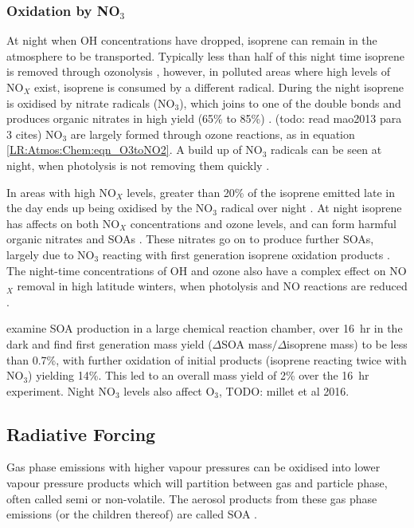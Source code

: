     \subsubsection{Oxidation by NO$_3$}
    At night when OH concentrations have dropped, isoprene can remain in the atmosphere to be transported.
    Typically less than half of this night time isoprene is removed through ozonolysis \citep{AtkinsonArey2003}, however, in polluted areas where high levels of NO$_X$ exist, isoprene is consumed by a different radical.
    During the night isoprene is oxidised by nitrate radicals (NO$_3$), which joins to one of the double bonds and produces organic nitrates in high yield (65\% to 85\%) \citep{Mao2013}. (todo: read mao2013 para 3 cites)
    NO$_3$ are largely formed through ozone reactions, as in equation \ref{LR:Atmos:Chem:eqn_O3toNO2}.
    A build up of NO$_3$ radicals can be seen at night, when photolysis is not removing them quickly \citep{Atkinson2000,Brown2009}.
    
    In areas with high NO$_X$ levels, greater than 20\% of the isoprene emitted late in the day ends up being oxidised by the NO$_3$ radical over night \citep{Brown2009}.
    At night isoprene has affects on both NO$_X$ concentrations and ozone levels, and can form harmful organic nitrates and SOAs \citep{Brown2009, Mao2013}.
    These nitrates go on to produce further SOAs, largely due to NO$_3$ reacting with first generation isoprene oxidation products \citep{Rollins2009}.
    The night-time concentrations of OH and ozone also have a complex effect on NO$_X$ removal in high latitude winters, when photolysis and NO reactions are reduced \citep{Ayers2006}.
    
    
    \cite{Rollins2009} examine SOA production in a large chemical reaction chamber, over 16~hr in the dark and find first generation mass yield ($\Delta$SOA mass$/\Delta$isoprene mass) to be less than 0.7\%, with further oxidation of initial products (isoprene reacting twice with NO$_3$) yielding 14\%.
    This led to an overall mass yield of 2\% over the 16~hr experiment.
    Night NO$_3$ levels also affect O$_3$, TODO: millet et al 2016. %
    
    
    \subsection{Radiative Forcing}
    \label{LR:VOCs:IsopCascade:SOA}
    Gas phase emissions with higher vapour pressures can be oxidised into lower vapour pressure products which will partition between gas and particle phase, often called semi or non-volatile. 
    The aerosol products from these gas phase emissions (or the children thereof) are called SOA \citep{Kanakidou2005}.
    
